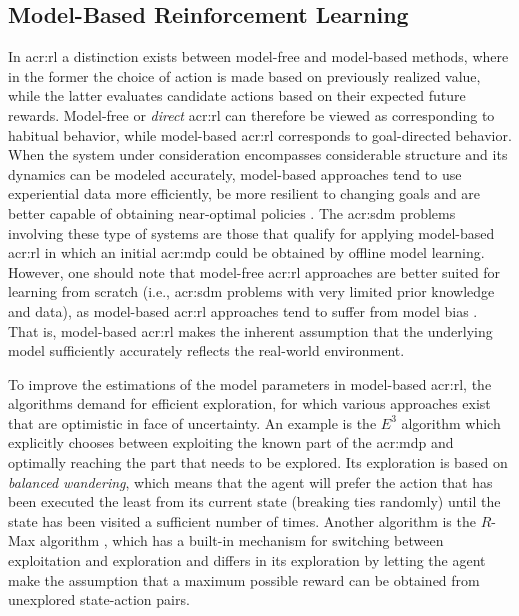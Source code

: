 \subsection{Model-Based Reinforcement Learning}
\label{sec:model-based-reinforcement-learning}

In \acrshort{acr:rl} a distinction exists between model-free and model-based methods, where in the former the choice of action is made based on previously realized value, while the latter evaluates candidate actions based on their expected future rewards.
Model-free or \textit{direct} \acrshort{acr:rl} can therefore be viewed as corresponding to habitual behavior, while model-based \acrshort{acr:rl} corresponds to goal-directed behavior.
When the system under consideration encompasses considerable structure and its dynamics can be modeled accurately, model-based approaches tend to use experiential data more efficiently, be more resilient to changing goals and are better capable of obtaining near-optimal policies \cite{atkeson1997}.
The \acrshort{acr:sdm} problems involving these type of systems are those that qualify for applying model-based \acrshort{acr:rl} in which an initial \acrshort{acr:mdp} could be obtained by offline model learning.
However, one should note that model-free \acrshort{acr:rl} approaches are better suited for learning from scratch (i.e., \acrshort{acr:sdm} problems with very limited prior knowledge and data), as model-based \acrshort{acr:rl} approaches tend to suffer from model bias \cite{deisenroth2011pilco}.
That is, model-based \acrshort{acr:rl} makes the inherent assumption that the underlying model sufficiently accurately reflects the real-world environment.

\newpage

To improve the estimations of the model parameters in model-based \acrshort{acr:rl}, the algorithms demand for efficient exploration, for which various approaches exist that are optimistic in face of uncertainty.
An example is the $E^3$ algorithm \cite{kearns2002near} which explicitly chooses between exploiting the known part of the \acrshort{acr:mdp} and optimally reaching the part that needs to be explored. 
Its exploration is based on \textit{balanced wandering}, which means that the agent will prefer the action that has been executed the least from its current state (breaking ties randomly) until the state has been visited a sufficient number of times.
Another algorithm is the $R$-Max algorithm \cite{Brafman2002}, which has a built-in mechanism for switching between exploitation and exploration and differs in its exploration by letting the agent make the assumption that a maximum possible reward can be obtained from unexplored state-action pairs.

